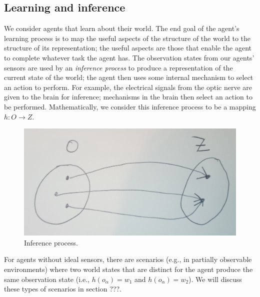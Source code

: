 \subsection{Learning and inference}

We consider agents that learn about their world.
The end goal of the agent’s learning process is to map the useful aspects of the structure of the world to the structure of its representation; the useful aspects are those that enable the agent to complete whatever task the agent has.
The observation states from our agents' sensors are used by an \emph{inference process} to produce a representation of the current state of the world; the agent
then uses some internal mechanism to select an action to perform.
For example, the electrical signals from the optic nerve are given to the brain for inference; mechanisms in the brain then select an action to be performed.
Mathematically, we consider this inference process to be a mapping $h: O \to Z$.
\begin{figure}
	\centering
	\includegraphics[width=0.5\linewidth]{2MathematicalFramework/InitialFramework/Images/inference_process_O_to_Z.jpeg}
	\caption{
		Inference process.
	}
	\label{fig:inference_process_O_to_Z}
\end{figure}

For agents without ideal sensors, there are scenarios (e.g., in partially observable environments) where two world states that are distinct for the agent produce the same observation state (i.e., $h(o_{\alpha}) = w_{1}$ and $h(o_{\alpha}) = w_{2}$).
We will discuss these types of scenarios in section ???.

